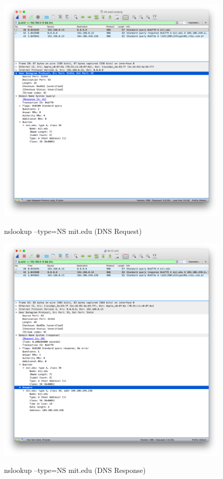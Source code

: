 \documentclass[11pt]{article}
\begin{document}
\begin{itemize}
		\begin{figure}[H]
		\centering
		\caption{nslookup –type=NS mit.edu (DNS Request)}
		\includegraphics[width=460px]{12}
		\label{fig:12}
		\end{figure}
		
		\begin{figure}[H]
		\centering
		\caption{nslookup –type=NS mit.edu (DNS Response)}
		\includegraphics[width=460px]{13}
		\label{fig:13}
		\end{figure}
		

\end{itemize}
\end{document}
